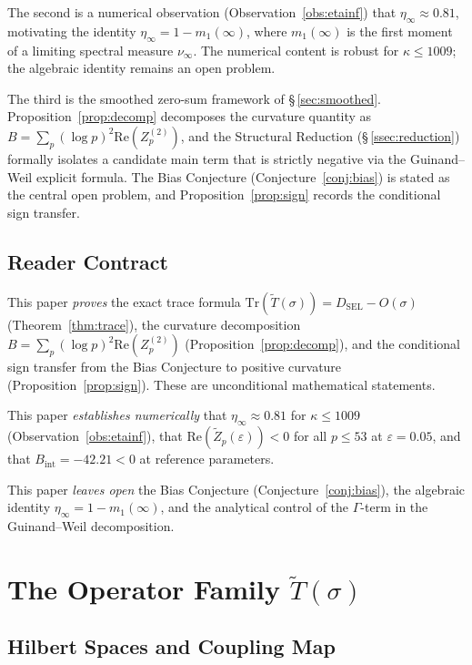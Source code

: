 \documentclass[11pt]{article}
\newcommand{\Tt}{\widetilde{T}}
\newcommand{\Zt}{\widetilde{Z}}
\newcommand{\DSEL}{D_{\mathrm{SEL}}}
\begin{document}
The second is a numerical observation (Observation~\ref{obs:etainf})
that $\eta_\infty\approx 0.81$, motivating the identity
$\eta_\infty = 1-m_1(\infty)$, where $m_1(\infty)$ is the first
moment of a limiting spectral measure $\nu_\infty$.
The numerical content is robust for $\kappa\leq 1009$;
the algebraic identity remains an open problem.

The third is the smoothed zero-sum framework of \S\,\ref{sec:smoothed}.
Proposition~\ref{prop:decomp} decomposes the curvature quantity as
$B = \sum_p(\log p)^2\allowbreak\mathrm{Re}(Z_p^{(2)})$,
and the Structural Reduction (\S\,\ref{ssec:reduction})
formally isolates a candidate main term that is strictly negative
via the Guinand--Weil explicit formula.
The Bias Conjecture (Conjecture~\ref{conj:bias}) is stated as the
central open problem, and Proposition~\ref{prop:sign} records the
conditional sign transfer.

\subsection{Reader Contract}

This paper \emph{proves} the exact trace formula
$\mathrm{Tr}(\Tt(\sigma)) = \DSEL - O(\sigma)$ (Theorem~\ref{thm:trace}),
the curvature decomposition
$B = \sum_p(\log p)^2\mathrm{Re}(Z_p^{(2)})$
(Proposition~\ref{prop:decomp}),
and the conditional sign transfer from the Bias Conjecture to
positive curvature (Proposition~\ref{prop:sign}).
These are unconditional mathematical statements.

This paper \emph{establishes numerically} that
$\eta_\infty\approx 0.81$ for $\kappa\leq 1009$
(Observation~\ref{obs:etainf}),
that $\mathrm{Re}(\Zt_p(\varepsilon))<0$ for all $p\leq 53$
at $\varepsilon=0.05$, and that
$B_{\mathrm{int}} = -42.21 < 0$ at reference parameters.

This paper \emph{leaves open} the Bias Conjecture
(Conjecture~\ref{conj:bias}), the algebraic identity
$\eta_\infty = 1-m_1(\infty)$, and the analytical control
of the $\Gamma$-term in the Guinand--Weil decomposition.

\section{The Operator Family \texorpdfstring{$\Tt(\sigma)$}{T-tilde(sigma)}}
\label{sec:ops}

\subsection{Hilbert Spaces and Coupling Map}
\end{document}
